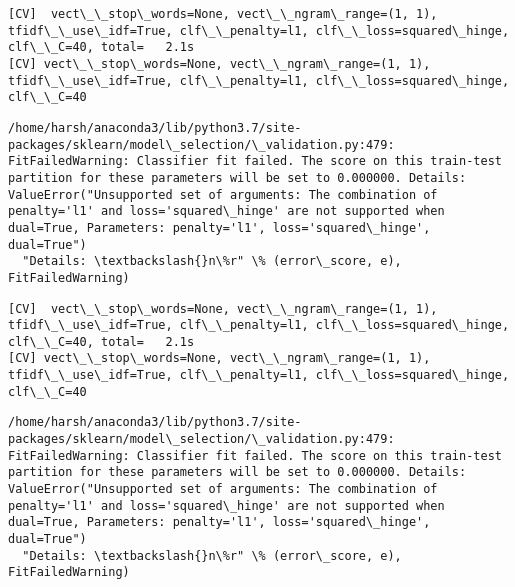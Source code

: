 \documentclass[11pt]{article}
\begin{document}
    \begin{Verbatim}[commandchars=\\\{\}]
[CV]  vect\_\_stop\_words=None, vect\_\_ngram\_range=(1, 1), tfidf\_\_use\_idf=True, clf\_\_penalty=l1, clf\_\_loss=squared\_hinge, clf\_\_C=40, total=   2.1s
[CV] vect\_\_stop\_words=None, vect\_\_ngram\_range=(1, 1), tfidf\_\_use\_idf=True, clf\_\_penalty=l1, clf\_\_loss=squared\_hinge, clf\_\_C=40 

    \end{Verbatim}

    \begin{Verbatim}[commandchars=\\\{\}]
/home/harsh/anaconda3/lib/python3.7/site-packages/sklearn/model\_selection/\_validation.py:479: FitFailedWarning: Classifier fit failed. The score on this train-test partition for these parameters will be set to 0.000000. Details: 
ValueError("Unsupported set of arguments: The combination of penalty='l1' and loss='squared\_hinge' are not supported when dual=True, Parameters: penalty='l1', loss='squared\_hinge', dual=True")
  "Details: \textbackslash{}n\%r" \% (error\_score, e), FitFailedWarning)

    \end{Verbatim}

    \begin{Verbatim}[commandchars=\\\{\}]
[CV]  vect\_\_stop\_words=None, vect\_\_ngram\_range=(1, 1), tfidf\_\_use\_idf=True, clf\_\_penalty=l1, clf\_\_loss=squared\_hinge, clf\_\_C=40, total=   2.1s
[CV] vect\_\_stop\_words=None, vect\_\_ngram\_range=(1, 1), tfidf\_\_use\_idf=True, clf\_\_penalty=l1, clf\_\_loss=squared\_hinge, clf\_\_C=40 

    \end{Verbatim}

    \begin{Verbatim}[commandchars=\\\{\}]
/home/harsh/anaconda3/lib/python3.7/site-packages/sklearn/model\_selection/\_validation.py:479: FitFailedWarning: Classifier fit failed. The score on this train-test partition for these parameters will be set to 0.000000. Details: 
ValueError("Unsupported set of arguments: The combination of penalty='l1' and loss='squared\_hinge' are not supported when dual=True, Parameters: penalty='l1', loss='squared\_hinge', dual=True")
  "Details: \textbackslash{}n\%r" \% (error\_score, e), FitFailedWarning)

    \end{Verbatim}
\end{document}
